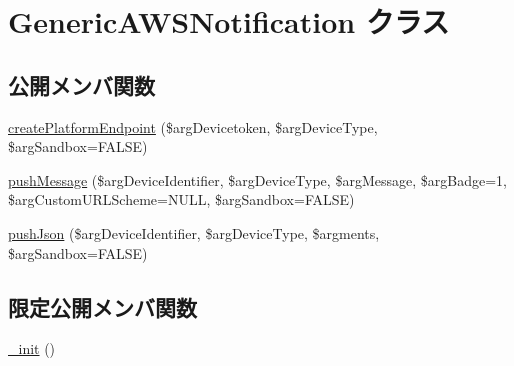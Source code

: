 \hypertarget{class_generic_a_w_s_notification}{}\section{Generic\+A\+W\+S\+Notification クラス}
\label{class_generic_a_w_s_notification}
\subsection*{公開メンバ関数}
\begin{DoxyCompactItemize}
\item 
\hyperlink{class_generic_a_w_s_notification_a45c52f3c6fb4b3b94bfcd360e875c329}{create\+Platform\+Endpoint} (\$arg\+Devicetoken, \$arg\+Device\+Type, \$arg\+Sandbox=F\+A\+L\+S\+E)
\item 
\hyperlink{class_generic_a_w_s_notification_ae81ac57ce65171a902dad09ef1c071f7}{push\+Message} (\$arg\+Device\+Identifier, \$arg\+Device\+Type, \$arg\+Message, \$arg\+Badge=1, \$arg\+Custom\+U\+R\+L\+Scheme=N\+U\+L\+L, \$arg\+Sandbox=F\+A\+L\+S\+E)
\item 
\hyperlink{class_generic_a_w_s_notification_a469a7c3d47a9e55c09c50bd65671b001}{push\+Json} (\$arg\+Device\+Identifier, \$arg\+Device\+Type, \$argments, \$arg\+Sandbox=F\+A\+L\+S\+E)
\end{DoxyCompactItemize}
\subsection*{限定公開メンバ関数}
\begin{DoxyCompactItemize}
\item 
\hyperlink{class_generic_a_w_s_notification_a703458780be7636fcd1b6e90d086b92e}{\+\_\+init} ()
\end{DoxyCompactItemize}
